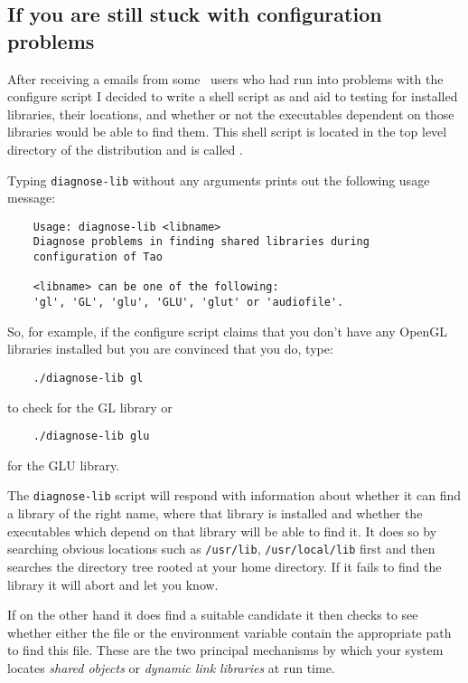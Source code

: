 \subsection{If you are still stuck with configuration problems}
\label{section:stillstuck}
After receiving a emails from some \tao\ users who had run into
problems with the configure script I decided to write a shell script
as and aid to testing for installed libraries, their locations,
and whether or not the executables dependent on those libraries
would be able to find them. This shell script is located in the top
level directory of the distribution and is called .

Typing \verb|diagnose-lib| without any arguments prints out the following
usage message:

\begin{verbatim}
    Usage: diagnose-lib <libname>
    Diagnose problems in finding shared libraries during
    configuration of Tao

    <libname> can be one of the following:
    'gl', 'GL', 'glu', 'GLU', 'glut' or 'audiofile'. 
\end{verbatim}

So, for example, if the configure script claims that you don't have any
OpenGL libraries installed but you are convinced that you do, type:

\begin{verbatim}
    ./diagnose-lib gl
\end{verbatim}
to check for the GL library or
\begin{verbatim}
    ./diagnose-lib glu
\end{verbatim}
for the GLU library.

The \verb|diagnose-lib| script will respond with information about whether
it can find a library of the right name, where that library is installed
and whether the executables which depend on that library will be able
to find it. It does so by searching obvious locations such as
\verb|/usr/lib|, \verb|/usr/local/lib| first and then searches the
directory tree rooted at your home directory. If it fails to find
the library it will abort and let you know.

If on the other hand it does find a suitable candidate it then checks
 to see whether either the file  or the environment
variable  contain the appropriate path to
find this file. These are the two principal mechanisms by which your
system locates \emph{shared objects} or \emph{dynamic link libraries}
at run time.

